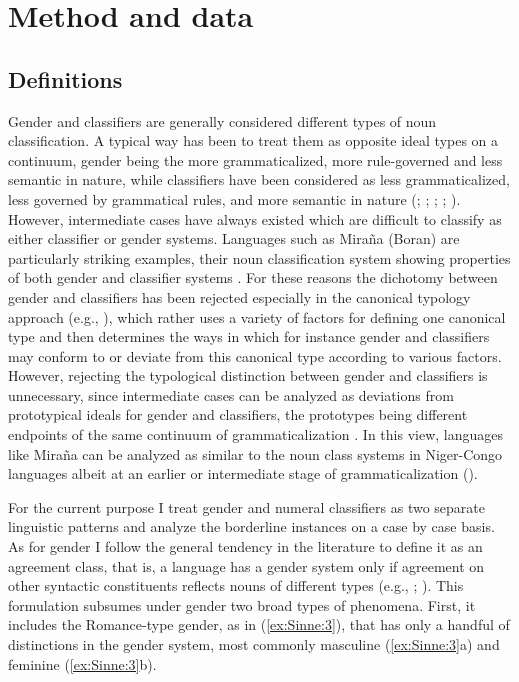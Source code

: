 \documentclass[output=collectionpaper]{langsci/langscibook}
\begin{document}
\section{Method and data}
\label{sec:Sinne:3}

\subsection{ Definitions}
\label{sec:Sinne:3.1}

Gender and classifiers are generally considered different types of noun classification. A typical way has been to treat them as opposite ideal types on a continuum, gender being the more grammaticalized, more rule-governed and less semantic in nature, while classifiers have been considered as less grammaticalized, less governed by grammatical rules, and more semantic in nature (\citealt{Dixon1982}; \citealt{Serzisko1982}; \citealt{Corbett1991}; \citealt{Aikhenvald2000}; \citealt{Passer2016b}). However, intermediate cases have always existed which are difficult to classify as either classifier or gender systems. Languages such as Miraña (Boran) are particularly striking examples, their noun classification system showing properties of both gender and classifier systems \citep{Seifart2005}. For these reasons the dichotomy between gender and classifiers has been rejected especially in the canonical typology approach (e.g., \citealt{Corbett2016}), which rather uses a variety of factors for defining one canonical type and then determines the ways in which for instance gender and classifiers may conform to or deviate from this canonical type according to various factors. However, rejecting the typological distinction between gender and classifiers is unnecessary, since intermediate cases can be analyzed as deviations from prototypical ideals for gender and classifiers, the prototypes being different endpoints of the same continuum of grammaticalization \citep{Passer2016b}. In this view, languages like Miraña can be analyzed as similar to the noun class systems in Niger-Congo languages albeit at an earlier or intermediate stage of grammaticalization (\citealt{Grinevald2004}).

For the current purpose I treat gender and numeral classifiers as two separate linguistic patterns and analyze the borderline instances on a case by case basis. As for gender I follow the general tendency in the literature to define it as an agreement class, that is, a language has a gender system only if agreement on other syntactic constituents reflects nouns of different types (e.g., \citealt[4--5]{Corbett1991}; \citealt[124--125]{Nichols1992}). This formulation subsumes under gender two broad types of phenomena. First, it includes the Romance-type gender, as in (\ref{ex:Sinne:3}), that has only a handful of distinctions in the gender system, most commonly masculine (\ref{ex:Sinne:3}a) and feminine (\ref{ex:Sinne:3}b).
\end{document}
